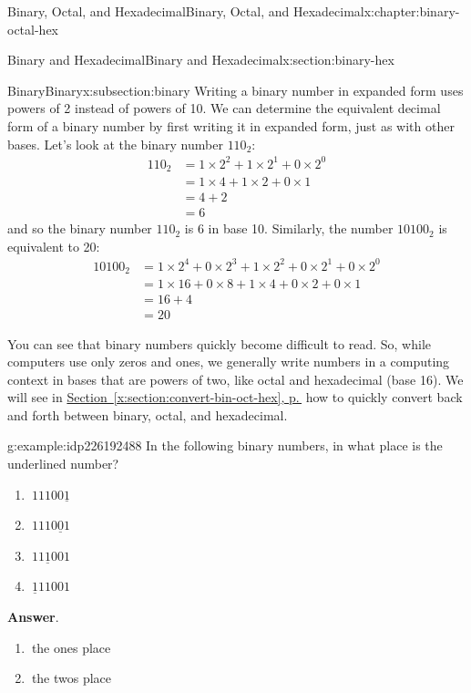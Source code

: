 \documentclass[twoside,10pt,]{book}
\newcommand{\blocktitlefont}{\relax}
\newcommand{\xreffont}{\relax}
\numberwithin{equation}{section}
\newcommand{\amp}{&}
\begin{document}
\begin{chapterptx}{Binary, Octal, and Hexadecimal}{}{Binary, Octal, and Hexadecimal}{}{}{x:chapter:binary-octal-hex}
\begin{sectionptx}{Binary and Hexadecimal}{}{Binary and Hexadecimal}{}{}{x:section:binary-hex}
\begin{subsectionptx}{Binary}{}{Binary}{}{}{x:subsection:binary}
Writing a binary number in expanded form uses powers of 2 instead of powers of 10.  We can determine the equivalent decimal form of a binary number by first writing it in expanded form, just as with other bases.  Let's look at the binary number \(110_2\):%
\begin{align*}
110_2 \amp =1\times 2^2+1\times2^1+0\times2^0\\
\amp = 1\times 4+1\times 2+0\times 1\\
\amp =4+2\\
\amp = 6
\end{align*}
and so the binary number \(110_2\) is 6 in base 10.  Similarly, the number \(10100_2\) is equivalent to 20:%
\begin{align*}
10100_2 \amp =1\times2^4+0\times2^3+1\times2^2+0\times2^1+0\times2^0\\
\amp = 1\times16+0\times 8+1\times 4+0\times 2+0\times 1\\
\amp = 16+4\\
\amp = 20
\end{align*}
%
\par
You can see that binary numbers quickly become difficult to read. So, while computers use only zeros and ones, we generally write numbers in a computing context in bases that are powers of two, like octal and hexadecimal (base 16).  We will see in \hyperref[x:section:convert-bin-oct-hex]{Section~{\xreffont\ref{x:section:convert-bin-oct-hex}}, p.\,\pageref{x:section:convert-bin-oct-hex}} how to quickly convert back and forth between binary, octal, and hexadecimal.%
\begin{example}{}{g:example:idp226192488}%
In the following binary numbers, in what place is the underlined number?%
\begin{enumerate}
\item{}\(\displaystyle \ 11100\underline{1}\)%
\item{}\(\displaystyle \ 1110\underline{0}1\)%
\item{}\(\displaystyle \ 11\underline{1}001\)%
\item{}\(\displaystyle \ \underline{1}11001\)%
\end{enumerate}
%
\par\smallskip%
\noindent\textbf{\blocktitlefont Answer}.\label{g:answer:idp226196840}{}\hypertarget{g:answer:idp226196840}{}\quad{}%
\begin{enumerate}
\item{}\(\ \)the ones place%
\item{}\(\ \)the twos place%

\end{enumerate}
\end{example}
\end{subsectionptx}
\end{sectionptx}
\end{chapterptx}
\end{document}
